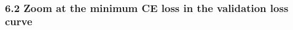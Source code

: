 \documentclass[10pt]{article}
\begin{document}
    \begin{center}
    \end{center}
    { \hspace*{\fill} \\}
    
    \hypertarget{zoom-at-the-minimum-ce-loss-in-the-validation-loss-curve}{%
\subsubsection{6.2 Zoom at the minimum CE loss in the validation loss
curve}\label{zoom-at-the-minimum-ce-loss-in-the-validation-loss-curve}}
\end{document}
